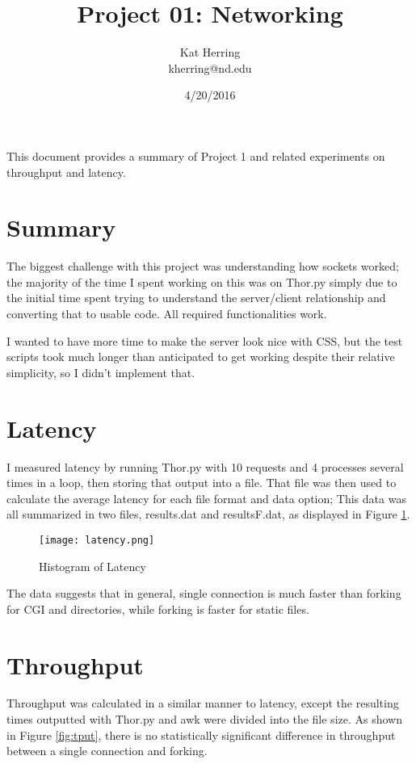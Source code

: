 \documentclass[letterpaper]{article}
\title{Project 01: Networking}
\date{4/20/2016}
\author{Kat Herring \\ kherring@nd.edu}
\begin{document}
\maketitle

This document provides a summary of Project 1 and related experiments on throughput and latency.

\section{Summary}

The biggest challenge with this project was understanding how sockets worked; the majority of the time I spent working on this was on Thor.py simply due to the initial time spent trying to understand the server/client relationship and converting that to usable code. All required functionalities work.

I wanted to have more time to make the server look nice with CSS, but the test scripts took much longer than anticipated to get working despite their relative simplicity, so I didn't implement that.

\section{Latency}

I measured latency by running Thor.py with 10 requests and 4 processes several times in a loop, then storing that output into a file. That file was then used to calculate the average latency for each file format and data option; This data was all summarized in two files, results.dat and resultsF.dat, as displayed in Figure \ref{fig:latency}.

\begin{figure}[h]
\centering
\texttt{[image: latency.png]}
\caption{Histogram of Latency}
\label{fig:latency}
\end{figure}

The data suggests that in general, single connection is much faster than forking for CGI and directories, while forking is faster for static files.

\section{Throughput}

Throughput was calculated in a similar manner to latency, except the resulting times outputted with Thor.py and awk were divided into the file size. As shown in Figure \ref{fig:tput}, there is no statistically significant difference in throughput between a single connection and forking.
\end{document}
